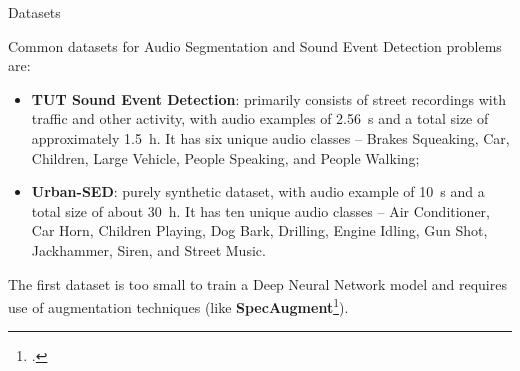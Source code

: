 	\begin{frame}{Datasets}
	
		Common datasets for Audio Segmentation and Sound Event Detection problems are:
		
		\begin{itemize}
			\item \textbf{TUT Sound Event Detection}: primarily consists of street recordings with traffic and other activity, with audio examples of \SI{2.56}{\second} and a total size of approximately \SI{1.5}{\hour}. It has six unique audio classes -- Brakes Squeaking, Car, Children, Large Vehicle, People Speaking, and People Walking;
			\item \textbf{Urban-SED}: purely synthetic dataset, with audio example of \SI{10}{\second} and a total size of about \SI{30}{\hour}. It has ten unique audio classes -- Air Conditioner, Car Horn, Children Playing, Dog Bark, Drilling, Engine Idling, Gun Shot, Jackhammer, Siren, and Street Music.
		\end{itemize}
		
		The first dataset is too small to train a Deep Neural Network model and requires use of augmentation techniques (like \textbf{SpecAugment}\footcite{park19e_interspeech}).

	\end{frame}
	

